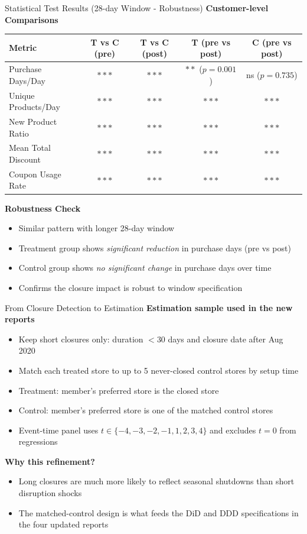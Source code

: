 \documentclass[aspectratio=169]{beamer}  %
\begin{document}
\begin{frame}{Statistical Test Results (28-day Window - Robustness)}
\textbf{Customer-level Comparisons}
\begin{table}[h]
\centering
\scriptsize
\begin{tabular}{lcccc}
\toprule
\textbf{Metric} & \textbf{T vs C (pre)} & \textbf{T vs C (post)} & \textbf{T (pre vs post)} & \textbf{C (pre vs post)} \\
\midrule
Purchase Days/Day & $***$ & $***$ & $**$ ($p=0.001$) & ns ($p=0.735$) \\
Unique Products/Day & $***$ & $***$ & $***$ & $***$ \\
New Product Ratio & $***$ & $***$ & $***$ & $***$ \\
Mean Total Discount & $***$ & $***$ & $***$ & $***$ \\
Coupon Usage Rate & $***$ & $***$ & $***$ & $***$ \\
\bottomrule
\end{tabular}
\end{table}

\textbf{Robustness Check}
\begin{itemize}
    \item Similar pattern with longer 28-day window
    \item Treatment group shows \textit{significant reduction} in purchase days (pre vs post)
    \item Control group shows \textit{no significant change} in purchase days over time
    \item Confirms the closure impact is robust to window specification
\end{itemize}
\end{frame}

\begin{frame}{From Closure Detection to Estimation}
\small
\textbf{Estimation sample used in the new reports}
\begin{itemize}
    \item Keep short closures only: duration $<30$ days and closure date after Aug 2020
    \item Match each treated store to up to 5 never-closed control stores by setup time
    \item Treatment: member's preferred store is the closed store
    \item Control: member's preferred store is one of the matched control stores
    \item Event-time panel uses $t \in \{-4,-3,-2,-1,1,2,3,4\}$ and excludes $t=0$ from regressions
\end{itemize}

\vspace{0.2cm}
\textbf{Why this refinement?}
\begin{itemize}
    \item Long closures are much more likely to reflect seasonal shutdowns than short disruption shocks
    \item The matched-control design is what feeds the DiD and DDD specifications in the four updated reports
\end{itemize}
\end{frame}
\end{document}
